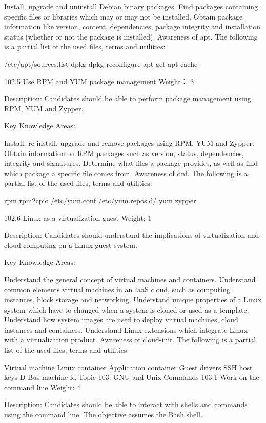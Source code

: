 Install, upgrade and uninstall Debian binary packages.
Find packages containing specific files or libraries which may or may not be installed.
Obtain package information like version, content, dependencies, package integrity and installation status (whether or not the package is installed).
Awareness of apt.
The following is a partial list of the used files, terms and utilities:

/etc/apt/sources.list
dpkg
dpkg-reconfigure
apt-get
apt-cache
 

102.5 Use RPM and YUM package management
Weight：  3

Description: Candidates should be able to perform package management using RPM, YUM and Zypper.

Key Knowledge Areas:

Install, re-install, upgrade and remove packages using RPM, YUM and Zypper.
Obtain information on RPM packages such as version, status, dependencies, integrity and signatures.
Determine what files a package provides, as well as find which package a specific file comes from.
Awareness of dnf.
The following is a partial list of the used files, terms and utilities:

rpm
rpm2cpio
/etc/yum.conf
/etc/yum.repos.d/
yum
zypper
 
102.6 Linux as a virtualization guest
Weight: 1

Description: Candidates should understand the implications of virtualization and cloud computing on a Linux guest system.

Key Knowledge Areas:

Understand the general concept of virtual machines and containers.
Understand common elements virtual machines in an IaaS cloud, such as computing instances, block storage and networking.
Understand unique properties of a Linux system which have to changed when a system is cloned or used as a template.
Understand how system images are used to deploy virtual machines, cloud instances and containers.
Understand Linux extensions which integrate Linux with a virtualization product.
Awareness of cloud-init.
The following is a partial list of the used files, terms and utilities:

Virtual machine
Linux container
Application container
Guest drivers
SSH host keys
D-Bus machine id
Topic 103: GNU and Unix Commands
103.1 Work on the command line
Weight: 4

Description: Candidates should be able to interact with shells and commands using the command line. The objective assumes the Bash shell.

